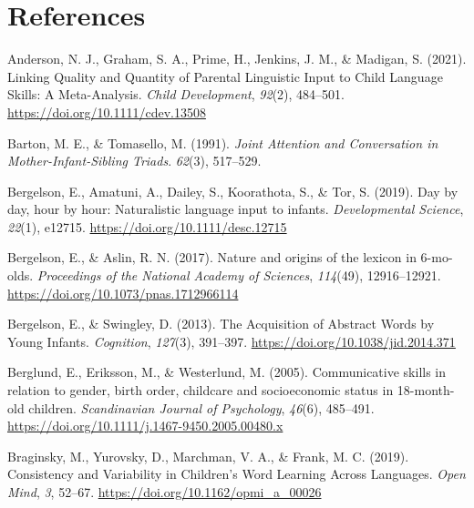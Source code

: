 \documentclass[
  english,
  man,floatsintext]{apa6}
\newlength{\cslhangindent}
\newlength{\cslentryspacingunit} %
\newenvironment{CSLReferences}[2] %
 {%
  \setlength{\parindent}{0pt}
  \ifodd #1
  \let\oldpar\par
  \def\par{\hangindent=\cslhangindent\oldpar}
  \fi
  \setlength{\parskip}{#2\cslentryspacingunit}
 }%
 {}
\begin{document}
\newpage

\hypertarget{references}{%
\section{References}\label{references}}

\begingroup
\setlength{\parindent}{-0.5in}
\setlength{\leftskip}{0.5in}

\hypertarget{refs}{}
\begin{CSLReferences}{1}{0}
\leavevmode{}%
Anderson, N. J., Graham, S. A., Prime, H., Jenkins, J. M., \& Madigan, S. (2021). Linking {Quality} and {Quantity} of {Parental} {Linguistic} {Input} to {Child} {Language} {Skills}: {A} {Meta}-{Analysis}. \emph{Child Development}, \emph{92}(2), 484--501. \url{https://doi.org/10.1111/cdev.13508}

\leavevmode{}%
Barton, M. E., \& Tomasello, M. (1991). \emph{Joint {Attention} and {Conversation} in {Mother}-{Infant}-{Sibling} {Triads}}. \emph{62}(3), 517--529.

\leavevmode{}%
Bergelson, E., Amatuni, A., Dailey, S., Koorathota, S., \& Tor, S. (2019). Day by day, hour by hour: {Naturalistic} language input to infants. \emph{Developmental Science}, \emph{22}(1), e12715. \url{https://doi.org/10.1111/desc.12715}

\leavevmode{}%
Bergelson, E., \& Aslin, R. N. (2017). Nature and origins of the lexicon in 6-mo-olds. \emph{Proceedings of the National Academy of Sciences}, \emph{114}(49), 12916--12921. \url{https://doi.org/10.1073/pnas.1712966114}

\leavevmode{}%
Bergelson, E., \& Swingley, D. (2013). The {Acquisition} of {Abstract} {Words} by {Young} {Infants}. \emph{Cognition}, \emph{127}(3), 391--397. \url{https://doi.org/10.1038/jid.2014.371}

\leavevmode{}%
Berglund, E., Eriksson, M., \& Westerlund, M. (2005). Communicative skills in relation to gender, birth order, childcare and socioeconomic status in 18-month-old children. \emph{Scandinavian Journal of Psychology}, \emph{46}(6), 485--491. \url{https://doi.org/10.1111/j.1467-9450.2005.00480.x}

\leavevmode{}%
Braginsky, M., Yurovsky, D., Marchman, V. A., \& Frank, M. C. (2019). Consistency and {Variability} in {Children}'s {Word} {Learning} {Across} {Languages}. \emph{Open Mind}, \emph{3}, 52--67. \url{https://doi.org/10.1162/opmi_a_00026}


\end{CSLReferences}
\end{document}
